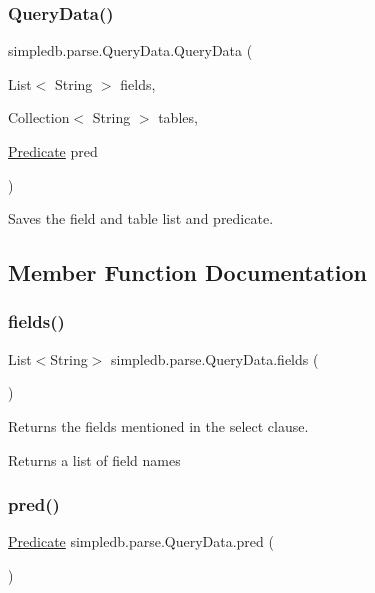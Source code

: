 \subsubsection{\texorpdfstring{Query\+Data()}{QueryData()}}
{\footnotesize\ttfamily simpledb.\+parse.\+Query\+Data.\+Query\+Data (\begin{DoxyParamCaption}\item[{List$<$ String $>$}]{fields,  }\item[{Collection$<$ String $>$}]{tables,  }\item[{\hyperlink{classsimpledb_1_1query_1_1Predicate}{Predicate}}]{pred }\end{DoxyParamCaption})\hspace{0.3cm}{\ttfamily [inline]}}

Saves the field and table list and predicate. 

\subsection{Member Function Documentation}
\mbox{\label{classsimpledb_1_1parse_1_1QueryData_a3fc0b39d3ac9755593a5b79c55654279}} 
\subsubsection{\texorpdfstring{fields()}{fields()}}
{\footnotesize\ttfamily List$<$String$>$ simpledb.\+parse.\+Query\+Data.\+fields (\begin{DoxyParamCaption}{ }\end{DoxyParamCaption})\hspace{0.3cm}{\ttfamily [inline]}}

Returns the fields mentioned in the select clause. \begin{DoxyReturn}{Returns}
a list of field names 
\end{DoxyReturn}
\mbox{\label{classsimpledb_1_1parse_1_1QueryData_ab53d5837aa506003cebefd3cfc7bfe79}} 
\subsubsection{\texorpdfstring{pred()}{pred()}}
{\footnotesize\ttfamily \hyperlink{classsimpledb_1_1query_1_1Predicate}{Predicate} simpledb.\+parse.\+Query\+Data.\+pred (\begin{DoxyParamCaption}{ }\end{DoxyParamCaption})\hspace{0.3cm}{\ttfamily [inline]}}

